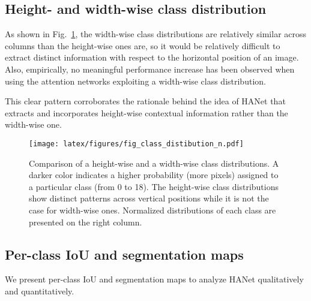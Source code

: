 \documentclass[10pt,twocolumn,letterpaper]{article}
\begin{document}
\begin{table}[!b]
\subsection{Height- and width-wise class distribution} \label{app:height_wdith}
\vspace*{-0.1cm}
As shown in Fig.~\ref{fig:row_vs_col}, the width-wise class distributions are relatively similar across columns than the height-wise ones are, so it would be relatively difficult to extract distinct information with respect to the horizontal position of an image. 
Also, empirically, no meaningful performance increase has been observed when using the attention networks exploiting a width-wise class distribution.

This clear pattern corroborates the rationale behind the idea of HANet that extracts and incorporates height-wise contextual information rather than the width-wise one.











\begin{figure}[!t]
\centering
  \texttt{[image: latex/figures/fig\_class\_distibution\_n.pdf]}
  \caption{Comparison of a height-wise and a width-wise class distributions. A darker color indicates a higher probability (more pixels) assigned to a particular class (from 0 to 18). The height-wise class distributions show distinct patterns across vertical positions while it is not the case for width-wise ones. Normalized distributions of each class are presented on the right column.
}
\label{fig:row_vs_col}
\vspace*{-0.3cm}
\end{figure}

\subsection{Per-class IoU and segmentation maps} \label{app:segmentation_maps}
\vspace*{-0.1cm}
We present per-class IoU and segmentation maps to analyze HANet qualitatively and quantitatively. 
\vspace*{-0.4cm}

\end{table}
\end{document}
